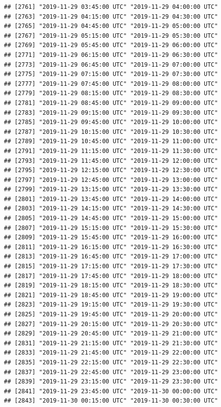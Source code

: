 \documentclass{article}\usepackage[]{graphicx}\usepackage[]{color}
\makeatletter
\newenvironment{kframe}{%
 \def\at@end@of@kframe{}%
 \ifinner\ifhmode%
  \def\at@end@of@kframe{\end{minipage}}%
  \begin{minipage}{\columnwidth}%
 \fi\fi%
 \def\FrameCommand##1{\hskip\@totalleftmargin \hskip-\fboxsep
 \colorbox{shadecolor}{##1}\hskip-\fboxsep
     \hskip-\linewidth \hskip-\@totalleftmargin \hskip\columnwidth}%
 \MakeFramed {\advance\hsize-\width
   \@totalleftmargin\z@ \linewidth\hsize
   \@setminipage}}%
 {\par\unskip\endMakeFramed%
 \at@end@of@kframe}
\newenvironment{knitrout}{}{} %
\makeatother
\begin{document}
\begin{knitrout}
\begin{kframe}
\begin{verbatim}
## [2761] "2019-11-29 03:45:00 UTC" "2019-11-29 04:00:00 UTC"
## [2763] "2019-11-29 04:15:00 UTC" "2019-11-29 04:30:00 UTC"
## [2765] "2019-11-29 04:45:00 UTC" "2019-11-29 05:00:00 UTC"
## [2767] "2019-11-29 05:15:00 UTC" "2019-11-29 05:30:00 UTC"
## [2769] "2019-11-29 05:45:00 UTC" "2019-11-29 06:00:00 UTC"
## [2771] "2019-11-29 06:15:00 UTC" "2019-11-29 06:30:00 UTC"
## [2773] "2019-11-29 06:45:00 UTC" "2019-11-29 07:00:00 UTC"
## [2775] "2019-11-29 07:15:00 UTC" "2019-11-29 07:30:00 UTC"
## [2777] "2019-11-29 07:45:00 UTC" "2019-11-29 08:00:00 UTC"
## [2779] "2019-11-29 08:15:00 UTC" "2019-11-29 08:30:00 UTC"
## [2781] "2019-11-29 08:45:00 UTC" "2019-11-29 09:00:00 UTC"
## [2783] "2019-11-29 09:15:00 UTC" "2019-11-29 09:30:00 UTC"
## [2785] "2019-11-29 09:45:00 UTC" "2019-11-29 10:00:00 UTC"
## [2787] "2019-11-29 10:15:00 UTC" "2019-11-29 10:30:00 UTC"
## [2789] "2019-11-29 10:45:00 UTC" "2019-11-29 11:00:00 UTC"
## [2791] "2019-11-29 11:15:00 UTC" "2019-11-29 11:30:00 UTC"
## [2793] "2019-11-29 11:45:00 UTC" "2019-11-29 12:00:00 UTC"
## [2795] "2019-11-29 12:15:00 UTC" "2019-11-29 12:30:00 UTC"
## [2797] "2019-11-29 12:45:00 UTC" "2019-11-29 13:00:00 UTC"
## [2799] "2019-11-29 13:15:00 UTC" "2019-11-29 13:30:00 UTC"
## [2801] "2019-11-29 13:45:00 UTC" "2019-11-29 14:00:00 UTC"
## [2803] "2019-11-29 14:15:00 UTC" "2019-11-29 14:30:00 UTC"
## [2805] "2019-11-29 14:45:00 UTC" "2019-11-29 15:00:00 UTC"
## [2807] "2019-11-29 15:15:00 UTC" "2019-11-29 15:30:00 UTC"
## [2809] "2019-11-29 15:45:00 UTC" "2019-11-29 16:00:00 UTC"
## [2811] "2019-11-29 16:15:00 UTC" "2019-11-29 16:30:00 UTC"
## [2813] "2019-11-29 16:45:00 UTC" "2019-11-29 17:00:00 UTC"
## [2815] "2019-11-29 17:15:00 UTC" "2019-11-29 17:30:00 UTC"
## [2817] "2019-11-29 17:45:00 UTC" "2019-11-29 18:00:00 UTC"
## [2819] "2019-11-29 18:15:00 UTC" "2019-11-29 18:30:00 UTC"
## [2821] "2019-11-29 18:45:00 UTC" "2019-11-29 19:00:00 UTC"
## [2823] "2019-11-29 19:15:00 UTC" "2019-11-29 19:30:00 UTC"
## [2825] "2019-11-29 19:45:00 UTC" "2019-11-29 20:00:00 UTC"
## [2827] "2019-11-29 20:15:00 UTC" "2019-11-29 20:30:00 UTC"
## [2829] "2019-11-29 20:45:00 UTC" "2019-11-29 21:00:00 UTC"
## [2831] "2019-11-29 21:15:00 UTC" "2019-11-29 21:30:00 UTC"
## [2833] "2019-11-29 21:45:00 UTC" "2019-11-29 22:00:00 UTC"
## [2835] "2019-11-29 22:15:00 UTC" "2019-11-29 22:30:00 UTC"
## [2837] "2019-11-29 22:45:00 UTC" "2019-11-29 23:00:00 UTC"
## [2839] "2019-11-29 23:15:00 UTC" "2019-11-29 23:30:00 UTC"
## [2841] "2019-11-29 23:45:00 UTC" "2019-11-30 00:00:00 UTC"
## [2843] "2019-11-30 00:15:00 UTC" "2019-11-30 00:30:00 UTC"

\end{verbatim}
\end{kframe}
\end{knitrout}
\end{document}
